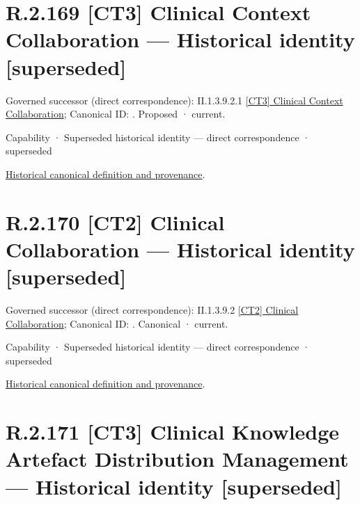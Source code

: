 \section*{R.2.169 [CT3] Clinical Context Collaboration — Historical identity [superseded]}
\label{navigation:R.2.169}

{\small Governed successor (direct correspondence): II.1.3.9.2.1 \hyperref[element:f11617eed6ff4d6fa237644ec95b28b2]{[CT3] Clinical Context Collaboration}; Canonical ID: \texttt{}. Proposed · current.}\par
\label{element:750ef0d8e1504a8e9a1fde9bf13a6d0c}
{\small Capability · Superseded historical identity — direct correspondence · superseded}\par
\href{../../../../../../../continuum/strategy/capability/750ef0d8e1504a8e9a1fde9bf13a6d0c.md}{Historical canonical definition and provenance}.\par
\section*{R.2.170 [CT2] Clinical Collaboration — Historical identity [superseded]}
\label{navigation:R.2.170}

{\small Governed successor (direct correspondence): II.1.3.9.2 \hyperref[element:e6429225463a44d39f82e490e254e5d4]{[CT2] Clinical Collaboration}; Canonical ID: \texttt{}. Canonical · current.}\par
\label{element:c5adc1955b6046d8b920b0176cebc9de}
{\small Capability · Superseded historical identity — direct correspondence · superseded}\par
\href{../../../../../../../continuum/strategy/capability/c5adc1955b6046d8b920b0176cebc9de.md}{Historical canonical definition and provenance}.\par
\section*{R.2.171 [CT3] Clinical Knowledge Artefact Distribution Management — Historical identity [superseded]}
\label{navigation:R.2.171}

